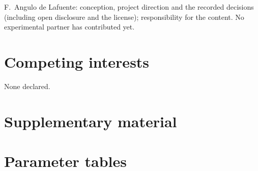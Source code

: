 \documentclass[11pt,a4paper]{article}
\begin{document}
F.~Angulo de Lafuente: conception, project direction and the recorded decisions (including open disclosure and the license); responsibility for the content. No experimental partner has contributed yet.

\section*{Competing interests}

None declared.

\FloatBarrier
{}


\clearpage
\appendix
\renewcommand{\thetable}{S\arabic{table}}
\setcounter{table}{0}
\section*{Supplementary material}

\section{Parameter tables}
\label{app:params}
\end{document}
